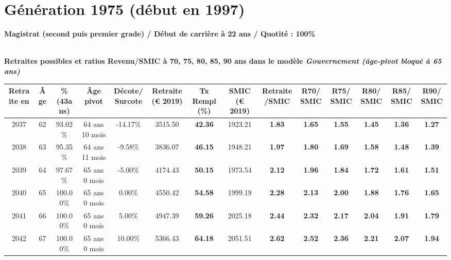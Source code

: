  \newpage 

\section{Génération 1975 (début en 1997)\label{Magistrat_100_1975_22_0}} 
 
{\bf \noindent Magistrat (second puis premier grade) / Début de carrière à 22 ans / Quotité : 100\%}  ~ 

 ~\\{\bf \noindent Retraites possibles et ratios Revenu/SMIC à 70, 75, 80, 85, 90 ans dans le modèle \emph{Gouvernement (âge-pivot bloqué à 65 ans)}}  
 
\begin{adjustbox}{max width=\textwidth} 
\begin{tabular}[htb]{|c|c||c|c|c||c|c||c|c||c|c|c|c|c|} 
\hline 
 Retraite en &  Âge &  \%(43ans) &  Âge pivot &  Décote/Surcote &  Retraite (\euro{} 2019) &  Tx Rempl(\%) &  SMIC (\euro{} 2019) &  Retraite/SMIC &  R70/SMIC &  R75/SMIC &  R80/SMIC &  R85/SMIC &  R90/SMIC \\ 
\hline \hline 
 2037 &  62 &  93.02\% &  64 ans 10 mois &  -14.17\% &  3515.50 &  {\bf 42.36} &  1923.21 &  {\bf 1.83} &  {\bf 1.65} &  {\bf 1.55} &  {\bf 1.45} &  {\bf 1.36} &  {\bf 1.27} \\ 
\hline 
 2038 &  63 &  95.35\% &  64 ans 11 mois &  -9.58\% &  3836.07 &  {\bf 46.15} &  1948.21 &  {\bf 1.97} &  {\bf 1.80} &  {\bf 1.69} &  {\bf 1.58} &  {\bf 1.48} &  {\bf 1.39} \\ 
\hline 
 2039 &  64 &  97.67\% &  65 ans 0 mois &  -5.00\% &  4174.43 &  {\bf 50.15} &  1973.54 &  {\bf 2.12} &  {\bf 1.96} &  {\bf 1.84} &  {\bf 1.72} &  {\bf 1.61} &  {\bf 1.51} \\ 
\hline 
 2040 &  65 &  100.00\% &  65 ans 0 mois &  0.00\% &  4550.42 &  {\bf 54.58} &  1999.19 &  {\bf 2.28} &  {\bf 2.13} &  {\bf 2.00} &  {\bf 1.88} &  {\bf 1.76} &  {\bf 1.65} \\ 
\hline 
 2041 &  66 &  100.00\% &  65 ans 0 mois &  5.00\% &  4947.39 &  {\bf 59.26} &  2025.18 &  {\bf 2.44} &  {\bf 2.32} &  {\bf 2.17} &  {\bf 2.04} &  {\bf 1.91} &  {\bf 1.79} \\ 
\hline 
 2042 &  67 &  100.00\% &  65 ans 0 mois &  10.00\% &  5366.43 &  {\bf 64.18} &  2051.51 &  {\bf 2.62} &  {\bf 2.52} &  {\bf 2.36} &  {\bf 2.21} &  {\bf 2.07} &  {\bf 1.94} \\ 
\hline 
\hline 
\end{tabular} 
\end{adjustbox} 
 
